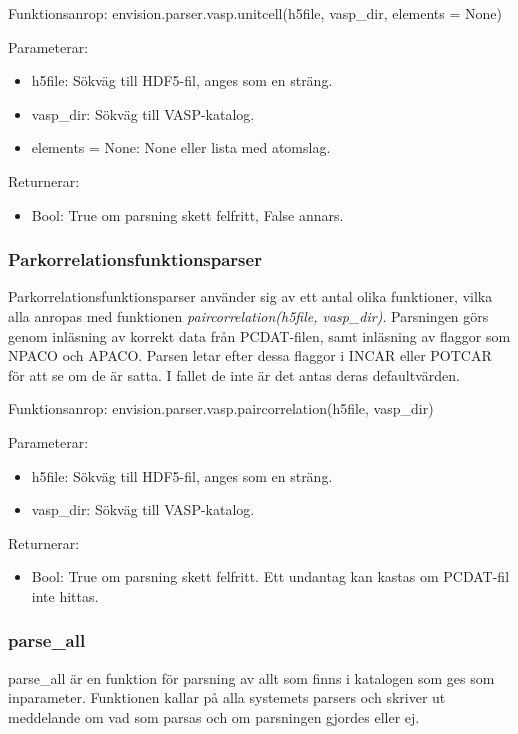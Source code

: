 Funktionsanrop: envision.parser.vasp.unitcell(h5file, vasp\_dir, elements = None)

Parameterar: 
\begin{itemize}
    \setlength\itemsep{0em}
    \item h5file: Sökväg till HDF5-fil, anges som en sträng.
    \item vasp\_dir: Sökväg till VASP-katalog.
    \item elements = None: None eller lista med atomslag. 
\end{itemize}

Returnerar: 
\begin{itemize}
    \item Bool: True om parsning skett felfritt, False annars.
\end{itemize}

\subsubsection{Parkorrelationsfunktionsparser}
Parkorrelationsfunktionsparser använder sig av ett antal olika funktioner, vilka alla anropas med funktionen \textit{paircorrelation(h5file, vasp\_dir)}. Parsningen görs genom inläsning av korrekt data från PCDAT-filen, samt inläsning av flaggor som NPACO och APACO. Parsen letar efter dessa flaggor i INCAR eller POTCAR för att se om de är satta. I fallet de inte är det antas deras defaultvärden.      

Funktionsanrop: envision.parser.vasp.paircorrelation(h5file, vasp\_dir) 

Parameterar: 
\begin{itemize}
    \setlength\itemsep{0em}
    \item h5file: Sökväg till HDF5-fil, anges som en sträng.
    \item vasp\_dir: Sökväg till VASP-katalog.
\end{itemize}

Returnerar: 
\begin{itemize}
    \item Bool: True om parsning skett felfritt. Ett undantag kan kastas om PCDAT-fil inte hittas.
\end{itemize}


\subsubsection{parse\_all}
parse\_all är en funktion för parsning av allt som finns i katalogen som ges som inparameter. Funktionen kallar på alla systemets parsers och skriver ut meddelande om vad som parsas och om parsningen gjordes eller ej.

